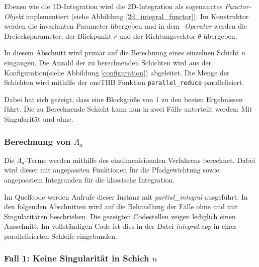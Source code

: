 Ebenso wie die 1D-Integration wird die 2D-Integration als sogenanntes \textit{Functor-Objekt} implementiert (siehe Abbildung \ref{2d_integral_functor}). 
Im Konstruktor werden die invarianten Parameter übergeben und in dem \textit{\(\)-Operator} werden die Dreiecksparameter, der Blickpunkt $r$ und der Richtungsvektor $\theta$ übergeben.

In diesem Abschnitt wird primär auf die Berechnung eines einzelnen Schicht $n$ eingangen. Die Anzahl der zu berechnenden Schichten wird aus der Konfiguration(siehe Abbildung \ref{configuration}) abgeleitet. 
Die Menge der Schichten wird mithilfe der oneTBB Funktion \texttt{parallel\_reduce} parallelisiert.

\begin{center}
    
    \label{2d_integral_parallel}
\end{center}

Dabei hat sich gezeigt, dass eine Blockgröße von 1 zu den besten Ergebnissen führt.
Die zu Berechnende Schicht kann nun in zwei Fälle unterteilt werden: Mit Singularität und ohne.

\subsubsection*{Berechnung von $\Lambda_a$}

Die $\Lambda_a$-Terme werden mithilfe des eindimenisionalen Verfahrens berechnet.
Dabei wird dieser mit angepassten Funktionen für die Pfadgewichtung sowie angepasstem Integranden für die klassische Integration.

\begin{center}
    
\end{center}

Im Quellcode werden Aufrufe dieser Instanz mit \textit{partial\_integral} ausgeführt.
In den folgenden Abschnitten wird auf die Behandlung der Fälle ohne und mit Singularitäten beschrieben.
Die gezeigten Codestellen zeigen lediglich einen Ausschnitt. Im vollständigen Code ist dies in der Datei \textit{integral.cpp} in einer parallelisierten Schleife
eingebunden. 

\subsubsection*{Fall 1: Keine Singularität in Schich $n$}

